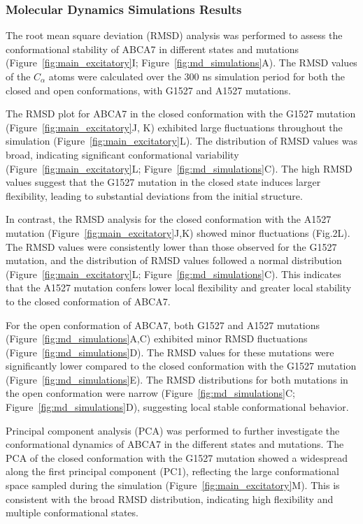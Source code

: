 \subsubsection{Molecular Dynamics Simulations Results} 
The root mean square deviation (RMSD) analysis was performed to assess the conformational stability of ABCA7 in different states and mutations (Figure~\ref{fig:main_excitatory}I; Figure~\ref{fig:md_simulations}A). The RMSD values of the $C_\alpha$ atoms were calculated over the 300 ns simulation period for both the closed and open conformations, with G1527 and A1527 mutations. 

The RMSD plot for ABCA7 in the closed conformation with the G1527 mutation (Figure~\ref{fig:main_excitatory}J, K) exhibited large fluctuations throughout the simulation (Figure~\ref{fig:main_excitatory}L). The distribution of RMSD values was broad, indicating significant conformational variability (Figure~\ref{fig:main_excitatory}L; Figure~\ref{fig:md_simulations}C). The high RMSD values suggest that the G1527 mutation in the closed state induces larger flexibility, leading to substantial deviations from the initial structure. 

In contrast, the RMSD analysis for the closed conformation with the A1527 mutation (Figure~\ref{fig:main_excitatory}J,K) showed minor fluctuations (Fig.2L). The RMSD values were consistently lower than those observed for the G1527 mutation, and the distribution of RMSD values followed a normal distribution (Figure~\ref{fig:main_excitatory}L; Figure~\ref{fig:md_simulations}C). This indicates that the A1527 mutation confers lower local flexibility and greater local stability to the closed conformation of ABCA7. 

For the open conformation of ABCA7, both G1527 and A1527 mutations (Figure~\ref{fig:md_simulations}A,C) exhibited minor RMSD fluctuations (Figure~\ref{fig:md_simulations}D). The RMSD values for these mutations were significantly lower compared to the closed conformation with the G1527 mutation (Figure~\ref{fig:md_simulations}E). The RMSD distributions for both mutations in the open conformation were narrow (Figure~\ref{fig:md_simulations}C; Figure~\ref{fig:md_simulations}D), suggesting local stable conformational behavior. 

Principal component analysis (PCA) was performed to further investigate the conformational dynamics of ABCA7 in the different states and mutations. The PCA of the closed conformation with the G1527 mutation showed a widespread along the first principal component (PC1), reflecting the large conformational space sampled during the simulation (Figure~\ref{fig:main_excitatory}M). This is consistent with the broad RMSD distribution, indicating high flexibility and multiple conformational states. 

